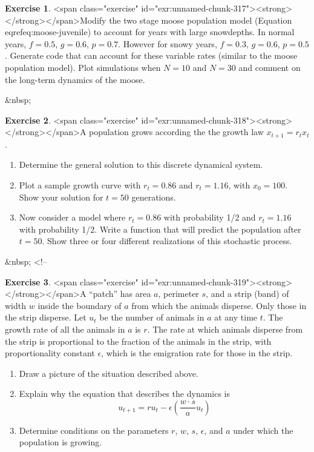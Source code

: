 \documentclass[
]{book}
\theoremstyle{definition}
\theoremstyle{definition}
\theoremstyle{definition}
\newtheorem{exercise}{Exercise}[chapter]
\theoremstyle{remark}
\begin{document}
\begin{exercise}
<span class="exercise" id="exr:unnamed-chunk-317"><strong>\label{exr:unnamed-chunk-317} </strong></span>Modify the two stage moose population model (Equation \\eqref{eq:moose-juvenile}) to account for years with large snowdepths. In normal years, $f=0.5$, $g=0.6$, $p=0.7$.  However for snowy years, $f=0.3$, $g=0.6$, $p=0.5$. Generate code that can account for these variable rates (similar to the moose population model). Plot simulations when $N=10$ and $N=30$ and comment on the long-term dynamics of the moose.
\end{exercise}
&nbsp;
\begin{exercise}
<span class="exercise" id="exr:unnamed-chunk-318"><strong>\label{exr:unnamed-chunk-318} </strong></span>A population grows according the the growth law $x_{t+1}=r_{t}x_{t}$.
\begin{enumerate}[label=\alph*.]
\item Determine the general solution to this discrete dynamical system.
\item Plot a sample growth curve with $r_{t}=0.86$ and $r_{t}=1.16$, with $x_{0}=100$. Show your solution for $t=50$ generations.
\item Now consider a model where $r_{t}=0.86$ with probability 1/2 and $r_{t}=1.16$ with probability 1/2.  Write a function that will predict the population after $t=50$.  Show three or four different realizations of this stochastic process.
\end{enumerate}
\end{exercise}

&nbsp;
 <!-- %
\begin{exercise}
<span class="exercise" id="exr:unnamed-chunk-319"><strong>\label{exr:unnamed-chunk-319} </strong></span>A ``patch'' has area $a$, perimeter $s$, and a strip (band) of width $w$ inside the boundary of $a$ from which the animals disperse.  Only those in the strip disperse.  Let $u_{t}$ be the number of animals in $a$ at any time $t$.  The growth rate of all the animals in $a$ is $r$.  The rate at which animals disperse from the strip is proportional to the fraction of the animals in the strip, with proportionality constant $\epsilon$, which is the emigration rate for those in the strip.

\begin{enumerate}[label=\alph*.]
\item Draw a picture of the situation described above.
\item Explain why the equation that describes the dynamics is $$ u_{t+1}=ru_{t} - \epsilon \left( \frac{w \cdot s}{a} u_{t} \right) $$
\item Determine conditions on the parameters $r$, $w$, $s$, $\epsilon$, and $a$ under which the population is growing.
\end{enumerate}
\end{exercise}
\end{document}
